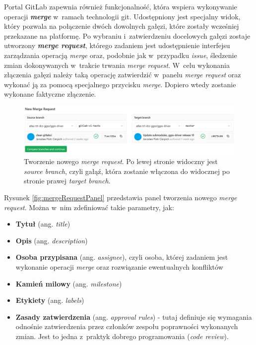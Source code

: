 Portal GitLab zapewnia również funkcjonalność, która wspiera wykonywanie operacji \textit{\textbf{merge}} w~ramach technologii \gls*{git}. Udostępniony jest specjalny widok, który pozwala na połączenie dwóch dowolnych gałęzi, które zostały wcześniej przekazane na platformę. Po wybraniu i~zatwierdzeniu docelowych gałęzi zostaje utworzony \textit{\textbf{merge request}}, którego zadaniem jest udostępnienie interfejsu zarządzania operacją \textit{merge} oraz, podobnie jak w~przypadku \textit{issue}, śledzenie zmian dokonywanych w~trakcie trwania \textit{merge request}. W~celu wykonania złączenia gałęzi należy taką operację zatwierdzić w~panelu \textit{merge request} oraz wykonać ją za pomocą specjalnego przycisku \textit{merge}. Dopiero wtedy zostanie wykonane faktyczne złączenie.\par

\begin{figure}[H]
\centering
\includegraphics[width=\textwidth]{res/png/newMergeRequest}
\caption{Tworzenie nowego \textit{merge request}. Po lewej stronie widoczny jest \textit{source branch}, czyli gałąź, która zostanie włączona do widocznej po stronie prawej \textit{target branch}.}
\end{figure}

\newpage

Rysunek \ref{fig:mergeRequestPanel} przedstawia panel tworzenia nowego \textit{merge request}. Można w~nim zdefiniować takie parametry, jak:
\begin{itemize}
\item \textbf{Tytuł} (ang. \textit{title})
\item \textbf{Opis} (ang. \textit{description})
\item \textbf{Osoba przypisana} (ang. \textit{assignee}), czyli osoba, której zadaniem jest wykonanie operacji \textit{merge} oraz rozwiązanie ewentualnych konfliktów
\item \textbf{Kamień milowy} (ang. \textit{milestone})
\item \textbf{Etykiety} (ang. \textit{labels})
\item \textbf{Zasady zatwierdzenia} (ang. \textit{approval rules}) - tutaj definiuje się wymagania odnośnie zatwierdzenia przez członków zespołu poprawności wykonanych zmian. Jest to jedna z~praktyk dobrego programowania (\textit{code review}).
\end{itemize}

